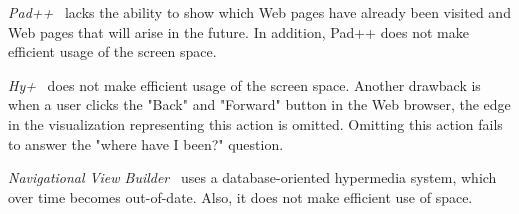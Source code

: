 \documentclass[]{article}
\begin{document}
{%
{\em Pad++}~\cite{b96} lacks the ability to show which Web pages have already been visited and Web pages that will arise in the future.
In addition, Pad++ does not make efficient usage of the screen space.

{\em Hy+}~\cite{hmv-95} does not make efficient usage of the screen space.  Another drawback is when a user clicks the "Back" and "Forward" button in the Web browser, the edge in the visualization representing this action is omitted.  Omitting this action fails to answer the "where have I been?" question.

{\em Navigational View Builder}~\cite{mf-95} uses a database-oriented hypermedia system, which over time becomes out-of-date.
Also, it does not make efficient use of space.


}
\end{document}
